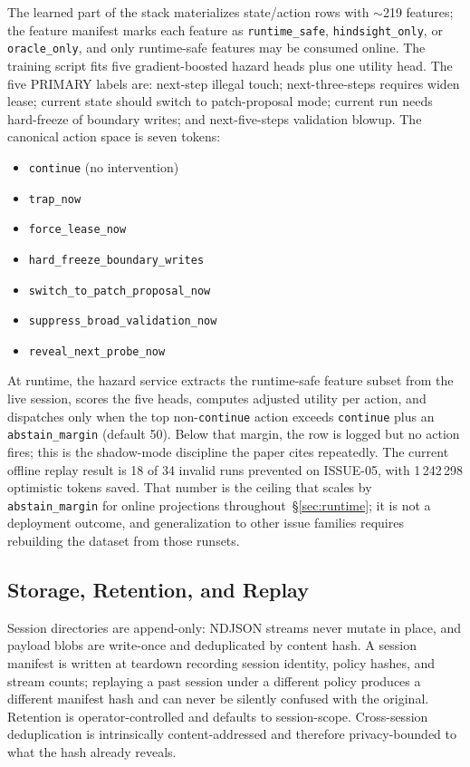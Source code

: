 \documentclass[conference]{IEEEtran}
\begin{document}
The learned part of the stack materializes state/action rows with $\sim$219 features; the feature manifest marks each feature as \texttt{runtime\_safe}, \texttt{hindsight\_only}, or \texttt{oracle\_only}, and only runtime-safe features may be consumed online. The training script fits five gradient-boosted hazard heads plus one utility head. The five PRIMARY labels are: next-step illegal touch; next-three-steps requires widen lease; current state should switch to patch-proposal mode; current run needs hard-freeze of boundary writes; and next-five-steps validation blowup. The canonical action space is seven tokens:
\begin{itemize}\itemsep 1pt \parsep 1pt \topsep 2pt
  \item \texttt{continue} (no intervention)
  \item \texttt{trap\_now}
  \item \texttt{force\_lease\_now}
  \item \texttt{hard\_freeze\_\allowbreak boundary\_writes}
  \item \texttt{switch\_to\_\allowbreak patch\_proposal\_now}
  \item \texttt{suppress\_\allowbreak broad\_\allowbreak validation\_now}
  \item \texttt{reveal\_next\_\allowbreak probe\_now}
\end{itemize}
At runtime, the hazard service extracts the runtime-safe feature subset from the live session, scores the five heads, computes adjusted utility per action, and dispatches only when the top non-\texttt{continue} action exceeds \texttt{continue} plus an \texttt{abstain\_margin} (default 50). Below that margin, the row is logged but no action fires; this is the shadow-mode discipline the paper cites repeatedly. The current offline replay result is 18 of 34 invalid runs prevented on ISSUE-05, with 1\,242\,298 optimistic tokens saved. That number is the ceiling that scales by \texttt{abstain\_margin} for online projections throughout~\S\ref{sec:runtime}; it is not a deployment outcome, and generalization to other issue families requires rebuilding the dataset from those runsets.

\subsection{Storage, Retention, and Replay}
\label{app:warpos-storage}

Session directories are append-only: NDJSON streams never mutate in place, and payload blobs are write-once and deduplicated by content hash. A session manifest is written at teardown recording session identity, policy hashes, and stream counts; replaying a past session under a different policy produces a different manifest hash and can never be silently confused with the original. Retention is operator-controlled and defaults to session-scope. Cross-session deduplication is intrinsically content-addressed and therefore privacy-bounded to what the hash already reveals.
\end{document}
